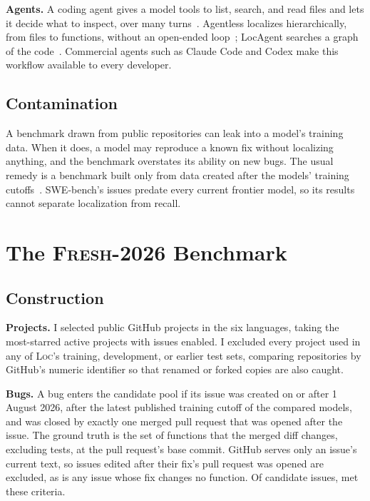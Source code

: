 \documentclass[acmsmall,screen,review,anonymous]{acmart}
\newcommand{\tool}{\textsc{Loc}\xspace}
\newcommand{\tool}{Allfather\xspace}
\newcommand{\fresh}{\textsc{Fresh-2026}\xspace}
\begin{document}
\textbf{Agents.} A coding agent gives a model tools to list, search, and read files and lets it decide what to inspect, over many turns~\cite{yang2024sweagent}. Agentless localizes hierarchically, from files to functions, without an open-ended loop~\cite{xia2024agentless}; LocAgent searches a graph of the code~\cite{chen2025locagent}. Commercial agents such as Claude Code and Codex make this workflow available to every developer.

\subsection{Contamination}

A benchmark drawn from public repositories can leak into a model's training data. When it does, a model may reproduce a known fix without localizing anything, and the benchmark overstates its ability on new bugs. The usual remedy is a benchmark built only from data created after the models' training cutoffs~\cite{jain2024livecodebench}. SWE-bench's issues predate every current frontier model, so its results cannot separate localization from recall.

\section{The \fresh Benchmark}
\label{sec:benchmark}

\subsection{Construction}

\textbf{Projects.} I selected public GitHub projects in the six languages, taking the most-starred active projects with issues enabled. I excluded every project used in any of \tool's training, development, or earlier test sets, comparing repositories by GitHub's numeric identifier so that renamed or forked copies are also caught.

\textbf{Bugs.} A bug enters the candidate pool if its issue was created on or after 1 August 2026, after the latest published training cutoff of the compared models, and was closed by exactly one merged pull request that was opened after the issue. The ground truth is the set of functions that the merged diff changes, excluding tests, at the pull request's base commit. GitHub serves only an issue's current text, so issues edited after their fix's pull request was opened are excluded, as is any issue whose fix changes no function. Of \NCandidates{} candidate issues, \NUsable{} met these criteria.
\end{document}
